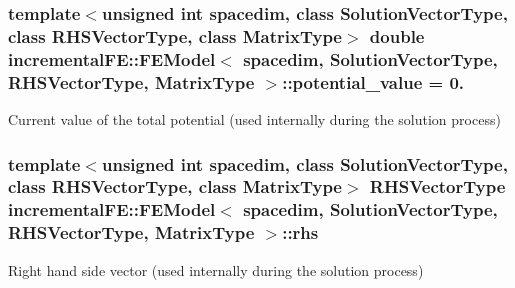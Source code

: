\subsubsection[{\texorpdfstring{potential\+\_\+value}{potential_value}}]{\setlength{\rightskip}{0pt plus 5cm}template$<$unsigned int spacedim, class Solution\+Vector\+Type, class R\+H\+S\+Vector\+Type, class Matrix\+Type$>$ double {\bf incremental\+F\+E\+::\+F\+E\+Model}$<$ spacedim, Solution\+Vector\+Type, R\+H\+S\+Vector\+Type, Matrix\+Type $>$\+::potential\+\_\+value = 0.\hspace{0.3cm}{\ttfamily [private]}}\hypertarget{classincremental_f_e_1_1_f_e_model_a04ea9240ef0084b44471a40f0d64ac54}{}\label{classincremental_f_e_1_1_f_e_model_a04ea9240ef0084b44471a40f0d64ac54}
Current value of the total potential (used internally during the solution process) 
\subsubsection[{\texorpdfstring{rhs}{rhs}}]{\setlength{\rightskip}{0pt plus 5cm}template$<$unsigned int spacedim, class Solution\+Vector\+Type, class R\+H\+S\+Vector\+Type, class Matrix\+Type$>$ R\+H\+S\+Vector\+Type {\bf incremental\+F\+E\+::\+F\+E\+Model}$<$ spacedim, Solution\+Vector\+Type, R\+H\+S\+Vector\+Type, Matrix\+Type $>$\+::rhs\hspace{0.3cm}{\ttfamily [private]}}\hypertarget{classincremental_f_e_1_1_f_e_model_aba8e9e925aa72d2dd0f86c451b2cf3d6}{}\label{classincremental_f_e_1_1_f_e_model_aba8e9e925aa72d2dd0f86c451b2cf3d6}
Right hand side vector (used internally during the solution process) 
